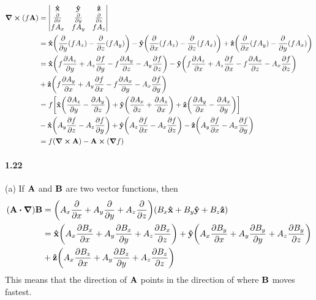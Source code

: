 \documentclass[../main.tex]{subfiles}
\begin{document}
\begin{align*}
    \curl(f\vb{A}) &= \begin{vmatrix}
        \vu{x} & \vu{y} & \vu{z} \\
        \pdv{x} & \pdv{y} & \pdv{z} \\
        fA_x & fA_y & fA_z
    \end{vmatrix} \\
    &= \vu{x} \qt(\pdv{y}(fA_z) - \pdv{z}(fA_y))
    - \vu{y} \qt(\pdv{x}(fA_z) - \pdv{z}(fA_x)) + \vu{z} \qt(\pdv{x}(fA_y) - \pdv{y}(fA_x)) \\
    &= \vu{x} \qt(f\pdv{A_z}{y} + A_z \pdv{f}{y} - f\pdv{A_y}{z} - A_y \pdv{f}{z})
    - \vu{y} \qt(f\pdv{A_z}{x} + A_z \pdv{f}{x} - f\pdv{A_x}{z} - A_x \pdv{f}{z}) \\
    &+ \vu{z} \qt(f\pdv{A_y}{x} + A_y \pdv{f}{x} - f\pdv{A_x}{y} - A_x \pdv{f}{y}) \\
    &= f \qt[\vu{x} \qt(\pdv{A_z}{y} - \pdv{A_y}{z}) + \vu{y} \qt(\pdv{A_x}{z} + \pdv{A_z}{x})
        + \vu{z} \qt(\pdv{A_y}{x} - \pdv{A_x}{y})] \\
    &- \vu{x} \qt(A_y \pdv{f}{z} - A_z \pdv{f}{y}) + \vu{y} \qt(A_z \pdv{f}{x} - A_x \pdv{f}{z})
        - \vu{z} \qt(A_y \pdv{f}{x} - A_x \pdv{f}{y}) \\
    &= f(\curl{\vb{A}}) - \vb{A} \cp (\grad{f})
\end{align*}

\paragraph{1.22}
(a) If $\vb{A}$ and $\vb{B}$ are two vector functions, then
\begin{align*}
    (\vb{A} \vdot \grad) \vb{B} &= \qt(A_x \pdv{x} + A_y \pdv{y} + A_z \pdv{z})
        (B_x \vu{x} + B_y \vu{y} + B_z \vu{z}) \\
    &= \vu{x} \qt(A_x \pdv{B_x}{x} + A_y \pdv{B_x}{y} + A_z \pdv{B_x}{z})
    + \vu{y} \qt(A_x \pdv{B_y}{x} + A_y \pdv{B_y}{y} + A_z \pdv{B_y}{z}) \\
    &+ \vu{z} \qt(A_x \pdv{B_z}{x} + A_y \pdv{B_z}{y} + A_z \pdv{B_z}{z})
\end{align*}
This means that the direction of $\vb{A}$ points in the direction of where $\vb{B}$ moves fastest.
\end{document}
